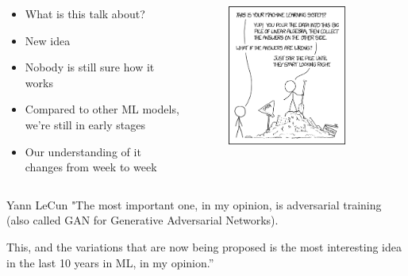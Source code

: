 \documentclass{Bredelebeamer}
\begin{document}
\begin{frame}
\begin{columns}
\begin{column}{0.5\textwidth}
	\begin{itemize}[<+(1)->]
		\item What is this talk about?
		\item New idea
		\item Nobody is still sure how it works
		\item Compared to other ML models, we're still in early stages
		\item Our understanding of it changes from week to week
	\end{itemize}
\end{column}
\begin{column}{0.5\textwidth}
	\begin{figure}[h!]
		\centering
		\includegraphics[width=0.8\textwidth]{xkcd_ml.png}
	\end{figure}
\end{column}
\end{columns}

\pause[7]
\begin{block}{Yann LeCun}
"The most important one, in my opinion, is adversarial training (also called GAN for Generative Adversarial Networks).

This, and the variations that are now being proposed is the most interesting idea in the last 10 years in ML, in my opinion.”
\end{block}
\end{frame}
\end{document}
